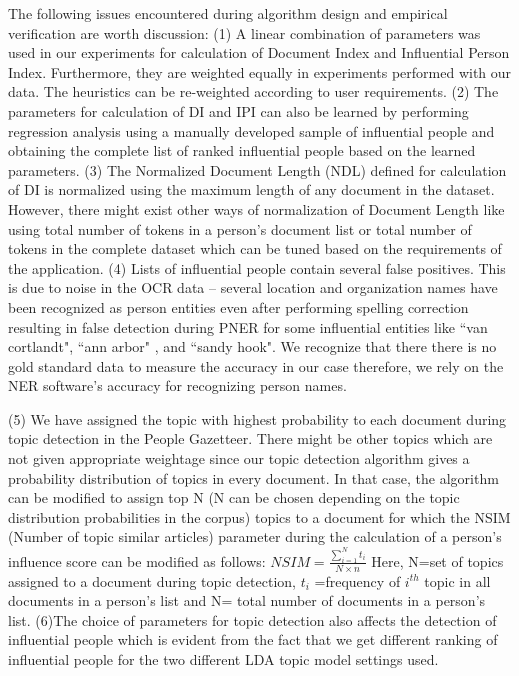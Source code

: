 The following issues encountered during algorithm design and empirical verification are worth discussion:
(1)  A linear combination of parameters was used in our experiments for calculation of Document Index and Influential Person Index. Furthermore, they are weighted equally in experiments performed with our data. The heuristics can be re-weighted according to user requirements. 
(2) The parameters for calculation of DI and IPI can also be learned by performing regression analysis using a manually developed sample of influential people and obtaining the complete list of ranked influential people based on the learned parameters.
(3) The Normalized Document Length (NDL) defined for calculation of DI is normalized using the maximum length of any document in the dataset. However, there might exist other ways of normalization of Document Length like using total number of tokens in a person's document list or total number of tokens in the complete dataset which can be tuned based on the requirements of the application.
(4) Lists of influential people contain several false positives. This is due to noise in the OCR data -- several location and organization names have been recognized as person entities even after performing spelling correction resulting in false detection during PNER for some influential entities like ``van cortlandt", ``ann arbor" ,  and ``sandy hook". We recognize that there there is no gold standard data to measure the accuracy in our case therefore, we rely on the NER software's accuracy for recognizing person names.
 
(5) We have assigned the topic with highest probability to each document during topic detection in the People Gazetteer. There might be other topics which are not given appropriate weightage since our topic detection algorithm gives a probability distribution of topics in every document. In that case, the algorithm can be modified to assign top N (N can be chosen depending on the topic distribution probabilities in the corpus) topics to a document for which the NSIM (Number of topic similar articles) parameter during the calculation of a person's influence score can be modified as follows: 
 $NSIM=  \frac{\sum_{i=1}^{N}t_i} { N\times n}$
Here, N=set of topics assigned to a document during topic detection,  $t_i$ =frequency of $i^{th}$ topic in all documents in a person's list and N= total number of documents in a person's list.
(6)The choice of parameters for topic detection also affects the detection of influential people which is evident from the fact that we get different ranking of influential people for the two different LDA topic model settings used. 





